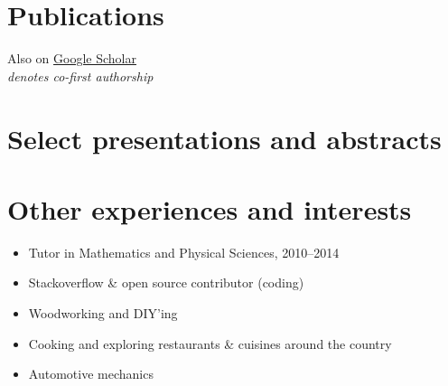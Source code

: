 \documentclass{article}
\begin{document}
\section*{Publications}
  
  Also on \href{https://scholar.google.com/citations?user=tcMs9UEAAAAJ&hl=en}{Google Scholar} \\
  \textsuperscript{\textbf{\textasteriskcentered}} \textit{denotes co-first authorship}
  
  
  
\section*{Select presentations and abstracts}
  

\section*{Other experiences and interests}
  \begin{itemize}%
    \item Tutor in Mathematics and Physical Sciences, 2010--2014
    \item Stackoverflow \& open source contributor (coding)
    \item Woodworking and DIY'ing
    \item Cooking and exploring restaurants \& cuisines around the country
    \item Automotive mechanics
  \end{itemize}
\end{document}
